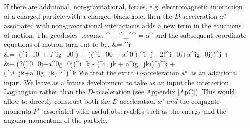 If there are additional, non-gravitational, forces, e.g. electromagnetic interaction of a charged particle with a charged black hole, then the $D$-acceleration $a^{\mu}$ associated with non-gravitational interactions adds a new term in the equations of motion. The geodesics become,
\be
	^{\rho} + \Gamma^{\rho}_{\mu\nu}^{\mu}^{\nu} = a^{\rho}
\ee
and the subsequent coordinate equations of motion turn out to be,
\be\ba\label{EOM_F}
	 &= \upsilon^{i} \\
	 &= -\bigg(\Gamma^{i}_{00} + a^{i}g_{00} \bigg) + \bigg(\left(\Gamma^{0}_{00} + a^{0} \right) \delta^{i}_{j} - 2\left(\Gamma^{i}_{0j}+a^{i}g_{0j}\right)\bigg)\upsilon^{j} + \\
	&+ \bigg(2\left(\Gamma^{0}_{0j}+a^{0}g_{0j}\right)\delta^{i}_{k} - \left(\Gamma^{i}_{jk} + a^{i}g_{jk}\right)\bigg)\upsilon^{j}\upsilon^{k} + \bigg(\Gamma^{0}_{jk}+a^{0}g_{jk}\bigg)\upsilon^{i}\upsilon^{j}\upsilon^{k}
\ea\ee
We treat the extra $D$-acceleration $a^{\mu}$ as an additional input. We leave as a future development to take as an input the interaction Lagrangian rather than the $D$-acceleration (see Appendix \ref{ApC}). This would allow to directly construct both the $D$-acceleration $a^{\mu}$ \textit{and} the conjugate momenta $P^{\mu}$ associated with useful observables such as the energy and the angular momentum of the particle.